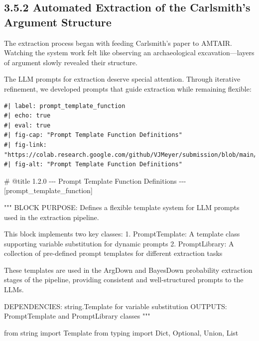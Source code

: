 \documentclass[
  11pt,
  letterpaper,
  openany]{book}
\newenvironment{Shaded}{\begin{snugshade}}{\end{snugshade}}
\newcommand{\CommentTok}[1]{\textcolor[rgb]{0.37,0.37,0.37}{#1}}
\newcommand{\ImportTok}[1]{\textcolor[rgb]{0.00,0.46,0.62}{#1}}
\newcommand{\NormalTok}[1]{\textcolor[rgb]{0.00,0.23,0.31}{#1}}
\begin{document}
\begin{landscape}

\subsection{3.5.2 Automated Extraction of the Carlsmith's Argument
Structure}\label{sec-carlsmith-extraction}

The extraction process began with feeding Carlsmith's paper to AMTAIR.
Watching the system work felt like observing an archaeological
excavation---layers of argument slowly revealed their structure.

The LLM prompts for extraction deserve special attention. Through
iterative refinement, we developed prompts that guide extraction while
remaining flexible:

\begin{verbatim}
#| label: prompt_template_function
#| echo: true
#| eval: true
#| fig-cap: "Prompt Template Function Definitions"
#| fig-link: "https://colab.research.google.com/github/VJMeyer/submission/blob/main/AMTAIR_Prototype/data/example_carlsmith/AMTAIR_Prototype_example_carlsmith.ipynb#scrollTo=MJpgdepF2Ug3&line=5&uniqifier=1"
#| fig-alt: "Prompt Template Function Definitions"
\end{verbatim}

\label{prompt_template_function}
\begin{Shaded}
\begin{Highlighting}[]
\CommentTok{\# @title 1.2.0 {-}{-}{-} Prompt Template Function Definitions {-}{-}{-} [prompt\_template\_function]}

\CommentTok{"""}
\CommentTok{BLOCK PURPOSE: Defines a flexible template system for LLM prompts used in the extraction pipeline.}

\CommentTok{This block implements two key classes:}
\CommentTok{1. PromptTemplate: A template class supporting variable substitution for dynamic prompts}
\CommentTok{2. PromptLibrary: A collection of pre{-}defined prompt templates for different extraction tasks}

\CommentTok{These templates are used in the ArgDown and BayesDown probability extraction}
\CommentTok{stages of the pipeline, providing consistent and well{-}structured prompts to the LLMs.}

\CommentTok{DEPENDENCIES: string.Template for variable substitution}
\CommentTok{OUTPUTS: PromptTemplate and PromptLibrary classes}
\CommentTok{"""}

\ImportTok{from}\NormalTok{ string }\ImportTok{import}\NormalTok{ Template}
\ImportTok{from}\NormalTok{ typing }\ImportTok{import}\NormalTok{ Dict, Optional, Union, List}


\end{Highlighting}
\end{Shaded}
\end{landscape}
\end{document}
